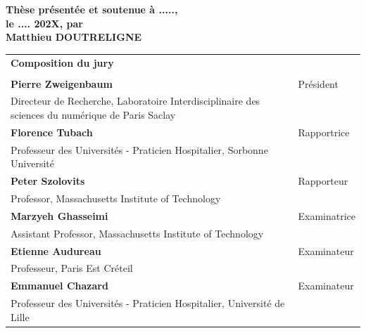 \documentclass[french,12pt,twoside,a4paper]{book}
\begin{document}
\begin{titlepage}
  \textbf{Thèse présentée et soutenue à .....,\\ le .... 202X, par}\\
  \bigskip
  \Large {\color{Prune} \textbf{Matthieu DOUTRELIGNE}}


  \vspace{\fill} %

  \bigskip

  \flushleft

  \scriptsize
  \begin{tabular}{|p{9cm}l}
    \arrayrulecolor{Prune}
    {\footnotesize \textbf{Composition du jury}}                                                                    \\
                                                                                                     &              \\
    \textbf{Pierre Zweigenbaum}                                                                      & Président    \\
    Directeur de Recherche, Laboratoire Interdisciplinaire des sciences du numérique de Paris Saclay &              \\
    \textbf{Florence Tubach}                                                                         & Rapportrice  \\
    Professeur des Universités - Praticien Hospitalier, Sorbonne Université                          &              \\
    \textbf{Peter Szolovits}                                                                         & Rapporteur   \\
    Professor, Massachusetts Institute of Technology                                                 &              \\
    \textbf{Marzyeh Ghasseimi}                                                                       & Examinatrice \\
    Assistant Professor, Massachusetts Institute of Technology                                       &              \\
    \textbf{Etienne Audureau}                                                                        & Examinateur  \\
    Professeur, Paris Est Créteil                                                                    &              \\
    \textbf{Emmanuel Chazard}                                                                        & Examinateur  \\
    Professeur des Universités - Praticien Hospitalier, Université de Lille                          &              \\
  \end{tabular}


\end{titlepage}
\end{document}
